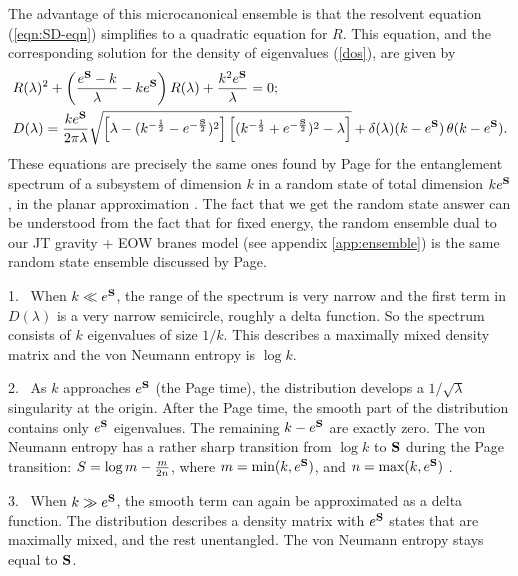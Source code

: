 \documentclass[11pt]{article}
\newcommand{\be}{\begin{equation}}
\newcommand{\ee}{\end{equation}}
\numberwithin{equation}{section}
\begin{document}
The advantage of this microcanonical ensemble is that the resolvent equation (\ref{eqn:SD-eqn}) simplifies to a quadratic equation for $R$. This equation, and the corresponding solution for the density of eigenvalues (\ref{dos}), are given by
\be
\begin{split}
	&R(\lambda)^2+\left({e^{{\bf S}}-k\over \lambda}-ke^{{\bf S}}\right)R(\lambda)+{k^2e^{{\bf S}}\over \lambda}=0;\\
	&D(\lambda)={k e^{{\bf S}}\over 2\pi \lambda}\sqrt{\left[\lambda-(k^{-{1\over2}}-e^{-{{\bf S}\over 2}})^2\right]\left[(k^{-{1\over 2}}+e^{-{{\bf S}\over 2}})^2-\lambda\right]}+\delta(\lambda) (k-e^{{\bf S}})\,\theta(k-e^{{\bf S}}).\label{microcanonicalAns}
\end{split}
\ee
These equations are precisely the same ones found by Page for the entanglement spectrum of a subsystem of dimension $k$ in a random state of total dimension $k e^{{\bf S}}$, in the planar approximation \cite{Page:1993df}. The fact that we get the random state answer can be understood from the fact that for fixed energy, the random ensemble dual to our JT gravity + EOW branes model (see appendix \ref{app:ensemble}) is the same random state ensemble discussed by Page.

1. \  When $k\ll e^{{\bf S}}$, the range of the spectrum is very narrow and the first term in $D(\lambda)$ is a very narrow semicircle, roughly a delta function. So the spectrum consists of $k$ eigenvalues of size $1/k$. This  describes a maximally mixed density matrix and the von Neumann entropy is $\log k$.

2. \ As $k$ approaches $e^{{\bf S}}$ (the Page time), the distribution develops a $1 / \sqrt{\lambda}$ singularity at the origin. After the Page time, the smooth part of the distribution contains only $e^{\bf{S}}$ eigenvalues. The remaining $k-e^{{\bf S}}$ are exactly zero. The von Neumann entropy has a rather sharp transition from $\log k$ to ${\bf S}$ during the Page transition: $S=\log m-{m\over 2n}$, where $m=\text{min}(k,e^{{\bf S}})$, and $n=\text{max}(k,e^{{\bf S}})$ \cite{Page:1993df}.

3. \ When $k\gg e^{{\bf S}}$, the smooth term can again be approximated as a delta function. The distribution describes a density matrix with $e^{{\bf S}}$ states that are maximally mixed, and the rest unentangled. The von Neumann entropy stays equal to ${\bf S}$.
\end{document}
